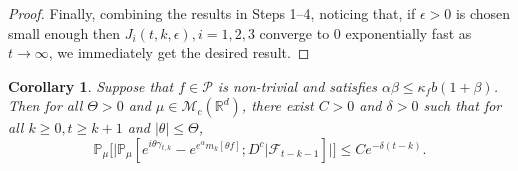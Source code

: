 \documentclass[12pt,a4paper]{amsart}
\theoremstyle{plain}
\newtheorem{cor}[thm]{Corollary}
\theoremstyle{definition}
\numberwithin{equation}{section}
\begin{document}
\begin{proof}
    Finally, combining the results in Steps 1--4, noticing that, if $\epsilon>0$ is chosen small enough then $J_{i}(t,k,\epsilon), i = 1,2,3$ converge to $0$ exponentially fast as $t\rightarrow\infty$, we immediately get the desired result.
\end{proof}

\begin{cor}\label{cor: used in next corollary}
   Suppose that $f\in \mathcal{P}$ is non-trivial and satisfies $\alpha\beta\leq \kappa_fb(1+\beta)$.
    Then for all $\Theta >0$ and $\mu\in \mathcal M_c(\mathbb R^d)$, there exist $C>0$ and $\delta>0$ such that for all $k \geq 0, t\geq k+1$ and $|\theta|\leq \Theta$,
\begin{equation}
    \mathbb{P}_{\mu}\Big[\big|\mathbb{P}_{\mu}[e^{i\theta\gamma_{t,k}}-e^{e^{\alpha}m_k[\theta f]}; D^c | \mathscr F_{t-k-1}]\big|\Big]
    \leq Ce^{-\delta(t-k)}.
\end{equation}
\end{cor}
\end{document}
